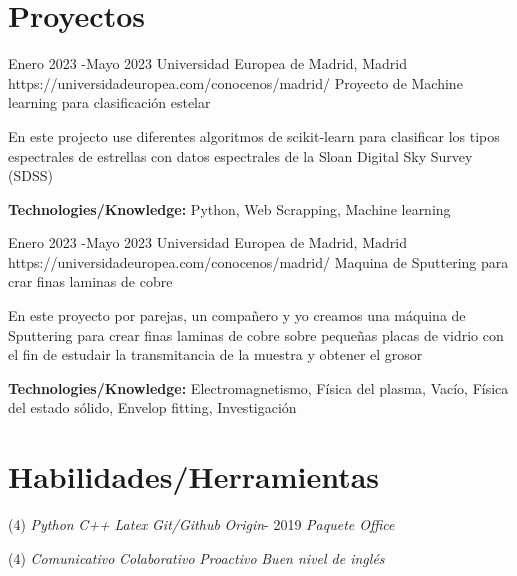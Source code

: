 \documentclass[10pt]{article} %
\begin{document}
\section{Proyectos}

\job
{Enero 2023 -}{Mayo 2023}
{Universidad Europea de Madrid, Madrid}
{https://universidadeuropea.com/conocenos/madrid/}
{Proyecto de Machine learning para clasificación estelar}
{En este projecto use diferentes algoritmos de scikit-learn para clasificar los tipos espectrales de estrellas con datos espectrales de la Sloan Digital Sky Survey (SDSS) \\
  \rule{0mm}{5mm}\textbf{Technologies/Knowledge:} Python, Web Scrapping, Machine learning}
\job
{Enero 2023 -}{Mayo 2023}
{Universidad Europea de Madrid, Madrid}
{https://universidadeuropea.com/conocenos/madrid/}
{Maquina de Sputtering para crar finas laminas de cobre}
{En este proyecto por parejas, un compañero y yo creamos una máquina de Sputtering para crear finas laminas de cobre sobre pequeñas placas de vidrio con el fin de estudair la transmitancia de la muestra y obtener el grosor\\
  \rule{0mm}{5mm}\textbf{Technologies/Knowledge:} Electromagnetismo, Física del plasma, Vacío, Física del estado sólido, Envelop fitting, Investigación}





\section{Habilidades/Herramientas}

{
  \begin{tasks}[counter-format={$\cdot$.}, label-align=left, label-offset={0mm}, label-width={5mm}, item-indent={5mm}, label-format={\bfseries}, column-sep=10mm](4)
    \task \textit{Python}
    \task \textit{C++}
    \task \textit{Latex}
    \task \textit{Git/Github}
    \task \textit{Origin}- 2019
    \task \textit{Paquete Office}
    
    \end{tasks}

}
{
  
  \begin{tasks}[counter-format={$\cdot$.}, label-align=left, label-offset={0mm}, label-width={5mm}, item-indent={5mm}, label-format={\bfseries}, column-sep=10mm](4)
    \task \textit{Comunicativo}
    \task \textit{Colaborativo}
    \task \textit{Proactivo}    
    \task \textit{Buen nivel de inglés}    
    
    
    \end{tasks}

}
\end{document}

